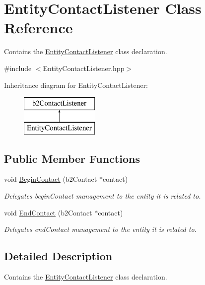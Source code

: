 \hypertarget{class_entity_contact_listener}{}\section{Entity\+Contact\+Listener Class Reference}
\label{class_entity_contact_listener}


Contains the \hyperlink{class_entity_contact_listener}{Entity\+Contact\+Listener} class declaration.  




{\ttfamily \#include $<$Entity\+Contact\+Listener.\+hpp$>$}

Inheritance diagram for Entity\+Contact\+Listener\+:\begin{figure}[H]
\begin{center}
\leavevmode
\includegraphics[height=2.000000cm]{class_entity_contact_listener}
\end{center}
\end{figure}
\subsection*{Public Member Functions}
\begin{DoxyCompactItemize}
\item 
void \hyperlink{class_entity_contact_listener_a39de8f983393da191320b0b3c0b85479}{Begin\+Contact} (b2\+Contact $\ast$contact)
\begin{DoxyCompactList}\small\item\em Delegates begin\+Contact management to the entity it is related to. \end{DoxyCompactList}\item 
void \hyperlink{class_entity_contact_listener_a5249dbe70cfb30d2e3aa629424bb66ab}{End\+Contact} (b2\+Contact $\ast$contact)
\begin{DoxyCompactList}\small\item\em Delegates end\+Contact management to the entity it is related to. \end{DoxyCompactList}\end{DoxyCompactItemize}


\subsection{Detailed Description}
Contains the \hyperlink{class_entity_contact_listener}{Entity\+Contact\+Listener} class declaration. 

